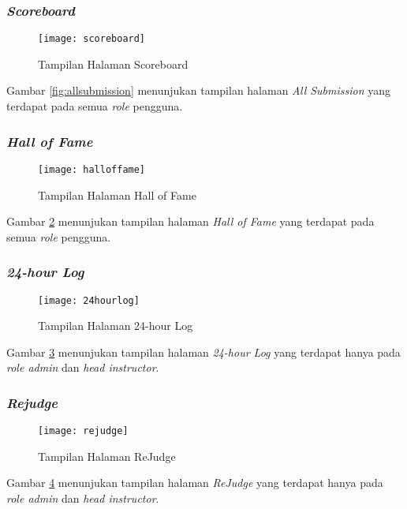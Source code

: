 \subsubsection{\textit{Scoreboard}}
\begin{figure}[H]
	\centering  
	\texttt{[image: scoreboard]}  
	\caption[Tampilan Halaman \textit{Scoreboard}]{Tampilan Halaman Scoreboard} 
	\label{fig:scoreboard} 
\end{figure}

Gambar \ref{fig:allsubmission} menunjukan tampilan halaman \textit{All Submission} yang terdapat pada semua \textit{role} pengguna.

\subsubsection{\textit{Hall of Fame}}
\begin{figure}[H]
	\centering  
	\texttt{[image: halloffame]}  
	\caption[Tampilan Halaman \textit{Hall of Fame}]{Tampilan Halaman Hall of Fame} 
	\label{fig:halloffame} 
\end{figure}

Gambar \ref{fig:halloffame} menunjukan tampilan halaman \textit{Hall of Fame} yang terdapat pada semua \textit{role} pengguna.


\subsubsection{\textit{24-hour Log}}
\begin{figure}[H]
	\centering  
	\texttt{[image: 24hourlog]}  
	\caption[Tampilan Halaman \textit{24-hour Log}]{Tampilan Halaman 24-hour Log} 
	\label{fig:24hourlog} 
\end{figure}

Gambar \ref{fig:24hourlog} menunjukan tampilan halaman \textit{24-hour Log} yang terdapat hanya pada \textit{role admin} dan \textit{head instructor}.

\subsubsection{\textit{Rejudge}}
\begin{figure}[H]
	\centering  
	\texttt{[image: rejudge]}  
	\caption[Tampilan Halaman \textit{ReJudge}]{Tampilan Halaman ReJudge} 
	\label{fig:rejudge} 
\end{figure}

Gambar \ref{fig:rejudge} menunjukan tampilan halaman \textit{ReJudge} yang terdapat hanya pada \textit{role admin} dan \textit{head instructor}.

